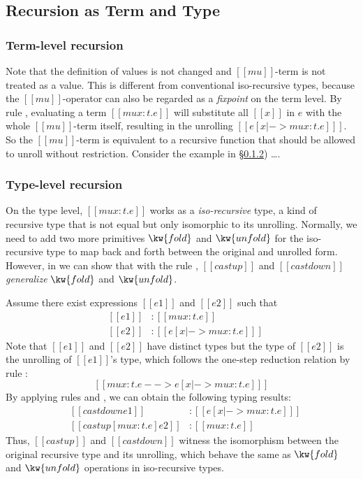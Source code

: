 \subsection{Recursion as Term and Type}
\subsubsection{Term-level recursion}

Note that the definition of values is not changed and $[[mu]]$-term is
not treated as a value. This is different from conventional
iso-recursive types, because the $[[mu]]$-operator can also be
regarded as a \emph{fixpoint} on the term level. By rule
, evaluating a term $[[mu x:t.e]]$ will substitute all
$[[x]]$ in $e$ with the whole $[[mu]]$-term itself, resulting in the
unrolling $[[e [x |-> mu x:t.e] ]]$. So the $[[mu]]$-term is
equivalent to a recursive function that should be allowed to unroll
without restriction. Consider the  example in \S \ref{}) \ldots.

\subsubsection{Type-level recursion}

On the type level, $[[mu x:t.e]]$ works as a \emph{iso-recursive}
type, a kind of recursive type that is not equal but only isomorphic
to its unrolling. Normally, we need to add two more primitives
$\kw{fold}$ and $\kw{unfold}$ for the iso-recursive type to map back
and forth between the original and unrolled form. However, in \name we
can show that with the rule , $[[castup]]$ and
$[[castdown]]$ \emph{generalize} $\kw{fold}$ and
$\kw{unfold}$.

Assume there exist expressions $[[e1]]$ and $[[e2]]$ such that 
\[\begin{array}{lll}
	&[[e1]] &: [[mu x:t.e]]\\
	&[[e2]] &: [[e [x |-> mu x:t.e] ]]
\end{array}\]
Note that $[[e1]]$ and $[[e2]]$ have distinct types but the type of $[[e2]]$ is the unrolling of $[[e1]]$'s type, which follows the one-step reduction relation by rule :
\[ [[mu x:t.e --> e [x |-> mu x:t.e] ]] \]
By applying rules  and , we can obtain the following typing results:
\[\begin{array}{lll}
	&[[castdown e1]] &: [[e [x |-> mu x:t.e] ]]\\
	&[[castup [mu x:t.e] e2]] &: [[mu x:t.e]]
\end{array}\]
Thus, $[[castup]]$ and $[[castdown]]$ witness the isomorphism between the original recursive type and its unrolling, which behave the same as $\kw{fold}$ and $\kw{unfold}$ operations in iso-recursive types.


